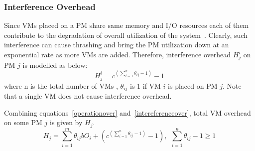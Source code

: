 \subsubsection{Interference Overhead}
Since VMs placed on a PM share same memory and I/O resources each of them contribute to the degradation of overall utilization of the system~\cite{lin2012interference}. Clearly, such interference can cause thrashing and bring the PM utilization down at an exponential rate as more VMs are added. Therefore, interference overhead $H_{j}^{i}$ on PM $j$ is modelled as below:   
\begin{equation}
 H_{j}^{i}=c^{(\sum_{i=1}^n \theta_{ij} -1)}-1
\label{intereferenceover}
\end{equation}
where n is the total number of VMs , $\theta_{ij}$ is 1 if VM $i$ is placed on PM $j$. Note that a single VM does not cause interference overhead.

Combining equations~\ref{operationover} and~\ref{intereferenceover}, total VM overhead on some PM $j$  is given by $H_j$. 
\begin{equation}
H_j=\sum_{i=1}^m \theta_{ij} b O_i+(c^{(\sum_{i=1}^n \theta_{ij}-1)}-1), \ \ \sum_{i=1}^n \theta_{ij}-1 \geqslant 1
\label{totaloverhead}
\end{equation}

